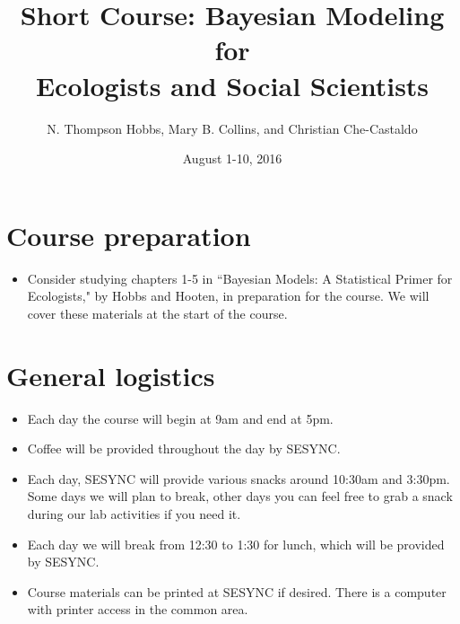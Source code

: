 \documentclass[12pt, oneside]{article}
\title{Short Course: Bayesian Modeling for \\
Ecologists and Social Scientists}
\author{N. Thompson Hobbs, Mary B. Collins, and Christian Che-Castaldo}
\date{August 1-10, 2016}
\begin{document}
\maketitle

\section*{Course preparation}
\begin{itemize}
\item Consider studying chapters 1-5 in ``Bayesian Models: A Statistical Primer for Ecologists," by Hobbs and Hooten, in preparation for the course.  We will cover these materials at the start of the course.
\end{itemize}

\section*{General logistics}
\begin{itemize}
\item{Each day the course will begin at 9am and end at 5pm.}
\item{Coffee will be provided throughout the day by SESYNC.}
\item{Each day, SESYNC will provide various snacks around 10:30am and 3:30pm. Some days we will plan to break, other days you can feel free to grab a snack during our lab activities if you need it.}
\item{Each day we will break from 12:30 to 1:30 for lunch, which will be provided by SESYNC.}
\item{Course materials can be printed at SESYNC if desired.  There is a computer with printer access in the common area.}
\end{itemize}
\pagebreak
\noindent
\end{document}
